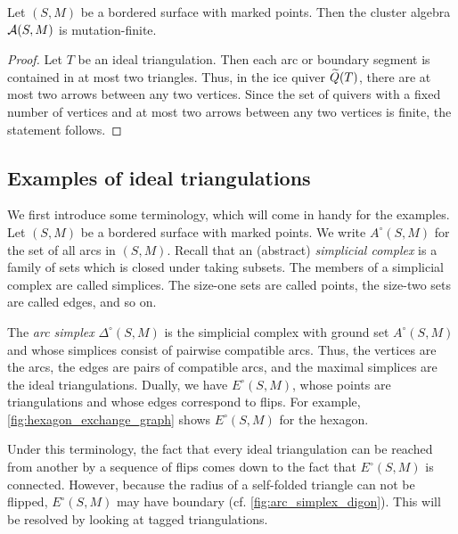 \begin{proposition}\label{prop:surface_mutation_finite}

	Let $(S, M)$ be a bordered surface with marked points. Then the cluster algebra
	$\mathcal{A}(S, M)$ is mutation-finite.
\end{proposition}
\begin{proof}

	Let $T$ be an ideal triangulation. Then each arc or boundary segment is contained in at
	most two triangles. Thus, in the ice quiver $\widetilde{Q}(T)$, there are at most two arrows
	between any two vertices. Since the set of quivers with a fixed number of vertices and
	at most two arrows between any two vertices is finite, the statement follows.
\end{proof}

\subsection{Examples of ideal triangulations}

We first introduce some terminology, which will come in handy for the examples. Let
$(S, M)$ be a bordered surface with marked points. We write $A^\circ(S, M)$ for the set of all arcs in $(S, M)$. Recall that an
(abstract) \emph{simplicial complex} is a family of sets
which is closed under taking subsets. The members of a simplicial complex are called
simplices. The size-one sets are called points, the size-two sets are called edges, and
so on.

The \emph{arc simplex} $\Delta^\circ (S, M)$ is the simplicial complex with ground set $A^\circ(S, M)$ and
whose simplices consist of pairwise compatible arcs. Thus, the vertices are the arcs,
the edges are pairs of compatible arcs, and the maximal simplices are the ideal
triangulations. Dually, we have $E^\circ(S, M)$,
whose points are triangulations and whose edges correspond to flips. For example,
\cref{fig:hexagon_exchange_graph} shows $E^\circ(S, M)$ for the hexagon.

Under this terminology, the fact that every ideal triangulation can be reached from
another by a sequence of flips comes down to the fact that $E^\circ(S,M)$ is connected.
However, because the radius of a self-folded triangle can not be flipped, $E^\circ(S,
	M)$ may have boundary (cf. \cref{fig:arc_simplex_digon}). This will be resolved by
looking at tagged triangulations.

